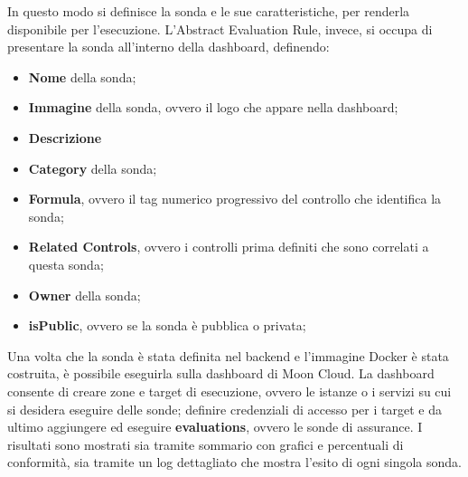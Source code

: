In questo modo si definisce la sonda e le sue caratteristiche, per renderla disponibile per l'esecuzione. L'Abstract Evaluation Rule, invece, si occupa di presentare la sonda all'interno della dashboard, definendo:

\begin{itemize}
    \item \textbf{Nome} della sonda;
    \item \textbf{Immagine} della sonda, ovvero il logo che appare nella dashboard;
    \item \textbf{Descrizione}
    \item \textbf{Category} della sonda;
    \item \textbf{Formula}, ovvero il tag numerico progressivo del controllo che identifica la sonda;
    \item \textbf{Related Controls}, ovvero i controlli prima definiti che sono correlati a questa sonda;
    \item \textbf{Owner} della sonda;
    \item \textbf{isPublic}, ovvero se la sonda è pubblica o privata;
\end{itemize}

Una volta che la sonda è stata definita nel backend e l'immagine Docker è stata costruita, è possibile eseguirla sulla dashboard di Moon Cloud. La dashboard consente di creare zone e target di esecuzione, ovvero le istanze o i servizi su cui si desidera eseguire delle sonde; definire credenziali di accesso per i target e da ultimo aggiungere ed eseguire \textbf{evaluations}, ovvero le sonde di assurance. I risultati sono mostrati sia tramite sommario con grafici e percentuali di conformità, sia tramite un log dettagliato che mostra l'esito di ogni singola sonda. 